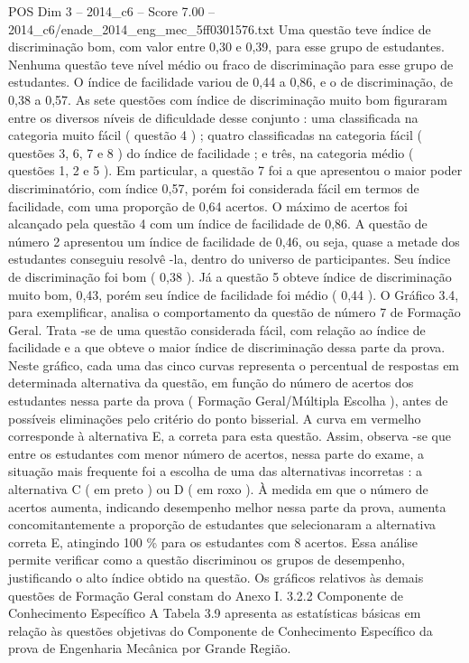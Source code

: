 \begin{textsample}{POS Dim 3 – 2014\_c6 – Score 7.00 – 2014\_c6/enade\_2014\_eng\_mec\_5ff0301576.txt}
Uma questão teve índice de discriminação bom, com valor entre 0,30 e 0,39, para esse grupo de estudantes.
Nenhuma questão teve nível médio ou fraco de discriminação para esse grupo de estudantes.
O índice de facilidade variou de 0,44 a 0,86, e o de discriminação, de 0,38 a 0,57.
As sete questões com índice de discriminação muito bom figuraram entre os diversos níveis de dificuldade desse conjunto : uma classificada na categoria muito fácil ( questão 4 ) ; quatro classificadas na categoria fácil ( questões 3, 6, 7 e 8 ) do índice de facilidade ; e três, na categoria médio ( questões 1, 2 e 5 ).
Em particular, a questão 7 foi a que apresentou o maior poder discriminatório, com índice 0,57, porém foi considerada fácil em termos de facilidade, com uma proporção de 0,64 acertos.
O máximo de acertos foi alcançado pela questão 4 com um índice de facilidade de 0,86.
A questão de número 2 apresentou um índice de facilidade de 0,46, ou seja, quase a metade dos estudantes conseguiu resolvê -la, dentro do universo de participantes.
Seu índice de discriminação foi bom ( 0,38 ).
Já a questão 5 obteve índice de discriminação muito bom, 0,43, porém seu índice de facilidade foi médio ( 0,44 ).
O Gráfico 3.4, para exemplificar, analisa o comportamento da questão de número 7 de Formação Geral.
Trata -se de uma questão considerada fácil, com relação ao índice de facilidade e a que obteve o maior índice de discriminação dessa parte da prova.
Neste gráfico, cada uma das cinco curvas representa o percentual de respostas em determinada alternativa da questão, em função do número de acertos dos estudantes nessa parte da prova ( Formação Geral/Múltipla Escolha ), antes de possíveis eliminações pelo critério do ponto bisserial.
A curva em vermelho corresponde à alternativa E, a correta para esta questão.
Assim, observa -se que entre os estudantes com menor número de acertos, nessa parte do exame, a situação mais frequente foi a escolha de uma das alternativas incorretas : a alternativa C ( em preto ) ou D ( em roxo ).
À medida em que o número de acertos aumenta, indicando desempenho melhor nessa parte da prova, aumenta concomitantemente a proporção de estudantes que selecionaram a alternativa correta E, atingindo 100 \% para os estudantes com 8 acertos.
Essa análise permite verificar como a questão discriminou os grupos de desempenho, justificando o alto índice obtido na questão.
Os gráficos relativos às demais questões de Formação Geral constam do Anexo I. 3.2.2 Componente de Conhecimento Específico A Tabela 3.9 apresenta as estatísticas básicas em relação às questões objetivas do Componente de Conhecimento Específico da prova de Engenharia Mecânica por Grande Região.

\end{textsample}
